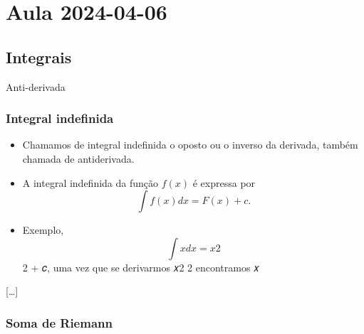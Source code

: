 \documentclass[
]{article}
\providecommand{\tightlist}{%
  \setlength{\itemsep}{0pt}\setlength{\parskip}{0pt}}
\begin{document}
\hypertarget{aula-2024-04-06}{%
\section{Aula 2024-04-06}\label{aula-2024-04-06}}

\hypertarget{integrais}{%
\subsection{Integrais}\label{integrais}}

Anti-derivada

\hypertarget{integral-indefinida}{%
\subsubsection{Integral indefinida}\label{integral-indefinida}}

\begin{itemize}
\tightlist
\item
  Chamamos de integral indefinida o oposto ou o inverso da derivada,
  também chamada de antiderivada.
\item
  A integral indefinida da função \(f(x)\) é expressa por \[
  ∫ 𝑓(𝑥)𝑑𝑥 = 𝐹 (𝑥) + 𝑐.
  \]
\item
  Exemplo, \[ 
  ∫ 𝑥𝑑𝑥 = 𝑥2
  \] 2 + 𝑐, uma vez que se derivarmos 𝑥2 2 encontramos 𝑥
\end{itemize}

{[}\ldots{]}

\hypertarget{soma-de-riemann}{%
\subsubsection{Soma de Riemann}\label{soma-de-riemann}}
\end{document}
